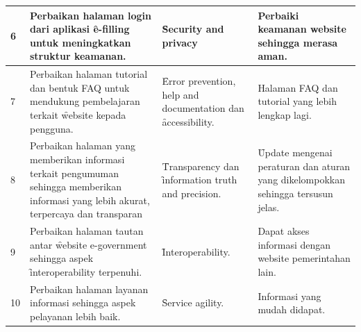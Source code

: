 \begin{center}
\begin{longtable}{|p{0.5cm}|p{3.8cm}|p{3.8cm}|p{4.2cm}|}
			6 & Perbaikan halaman login dari aplikasi \f{e-filling} untuk meningkatkan struktur keamanan. & \f{Security and privacy} & Perbaiki keamanan website sehingga merasa aman.  \\ \hline
			7 & Perbaikan halaman tutorial dan bentuk FAQ untuk mendukung pembelajaran terkait \f{website} kepada pengguna. & \f{Error prevention, help and documentation} dan \f{accessibility.} & Halaman FAQ dan tutorial yang lebih lengkap lagi. \\ \hline
			8 & Perbaikan halaman yang memberikan informasi terkait pengumuman sehingga memberikan informasi yang lebih akurat, terpercaya dan transparan & \f{Transparency} dan \f{information truth and precision.} & \f{Update} mengenai peraturan dan aturan yang dikelompokkan sehingga tersusun jelas. \\ \hline
			9   & Perbaikan halaman tautan antar \f{website e-government} sehingga aspek \f{interoperability} terpenuhi. & \f{Interoperability}. & Dapat akses informasi dengan website pemerintahan lain. \\ \hline
			10  & Perbaikan halaman layanan informasi sehingga aspek pelayanan lebih baik. & \f{Service agility}. & Informasi yang mudah didapat. \\ \hline
\end{longtable}
\end{center}

